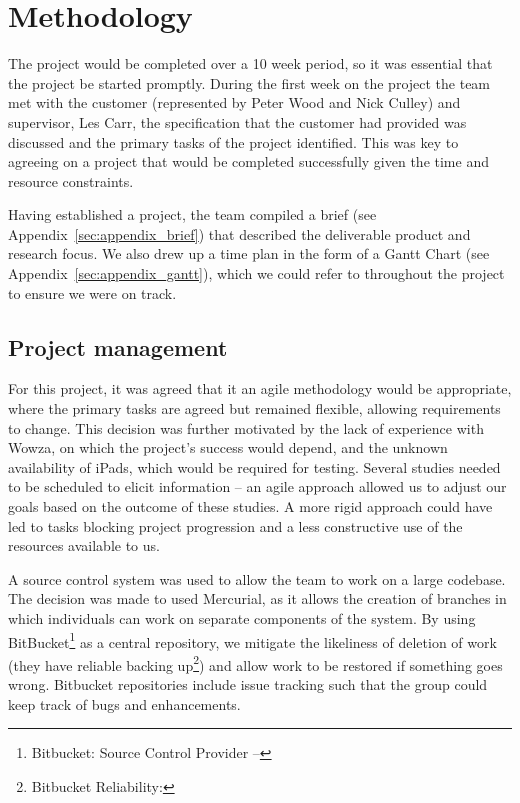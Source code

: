 \section{Methodology}

The project would be completed over a 10 week period, so it was essential that the project be started promptly. During the first week on the project the team met with the customer (represented by Peter Wood and Nick Culley) and supervisor, Les Carr, the specification that the customer had provided was discussed and the primary tasks of the project identified. This was key to agreeing on a project that would be completed successfully given the time and resource constraints.

Having established a project, the team compiled a brief (see Appendix~\ref{sec:appendix_brief}) that described the deliverable product and research focus. We also drew up a time plan in the form of a Gantt Chart (see Appendix~\ref{sec:appendix_gantt}), which we could refer to throughout the project to ensure we were on track.

\subsection{Project management}

For this project, it was agreed that it an agile methodology would be appropriate, where the primary tasks are agreed but remained flexible, allowing requirements to change. This decision was further motivated by the lack of experience with Wowza, on which the project's success would depend, and the unknown availability of iPads, which would be required for testing. Several studies needed to be scheduled to elicit information -- an agile approach allowed us to adjust our goals based on the outcome of these studies. A more rigid approach could have led to tasks blocking project progression and a less constructive use of the resources available to us.

A source control system was used to allow the team to work on a large codebase. The decision was made to used Mercurial, as it allows the creation of branches in which individuals can work on separate components of the system. By using BitBucket\footnote{Bitbucket: Source Control Provider -- } as a central repository, we mitigate the likeliness of deletion of work (they have reliable backing up\footnote{Bitbucket Reliability: }) and allow work to be restored if something goes wrong. Bitbucket repositories include issue tracking such that the group could keep track of bugs and enhancements.

